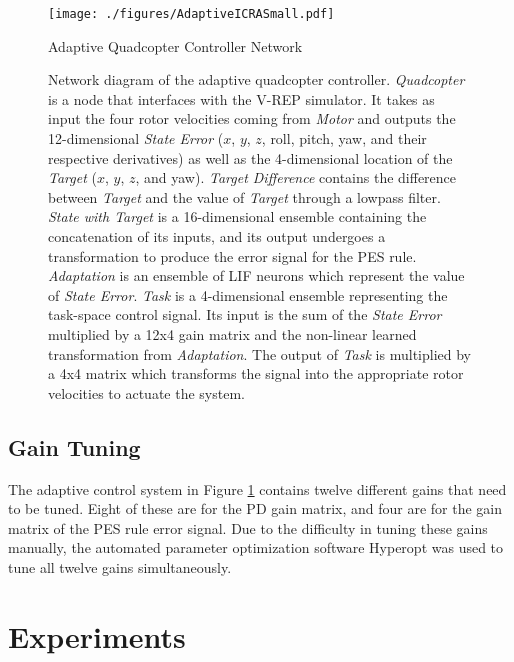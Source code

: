 \documentclass[letterpaper, 10 pt, conference]{ieeeconf}  %
\begin{document}
\begin{figure}
\centering
\texttt{[image: ./figures/AdaptiveICRASmall.pdf]}
\caption{Adaptive Quadcopter Controller Network}
\label{fig:NetFinal}
\captionsetup{singlelinecheck=off,font=footnotesize}
\caption*{Network diagram of the adaptive quadcopter controller. \textit{Quadcopter} is a node that interfaces with the V-REP simulator. It takes as input the four rotor velocities coming from \textit{Motor} and outputs the 12-dimensional \textit{State Error} ($x$, $y$, $z$, roll, pitch, yaw, and their respective derivatives) as well as the 4-dimensional location of the \textit{Target} ($x$, $y$, $z$, and yaw). \textit{Target Difference} contains the difference between \textit{Target} and the value of \textit{Target} through a lowpass filter. \textit{State with Target} is a 16-dimensional ensemble containing the concatenation of its inputs, and its output undergoes a transformation to produce the error signal for the PES rule. \textit{Adaptation} is an ensemble of LIF neurons which represent the value of \textit{State Error}. \textit{Task} is a 4-dimensional ensemble representing the task-space control signal. Its input is the sum of the \textit{State Error} multiplied by a 12x4 gain matrix and the non-linear learned transformation from \textit{Adaptation}. The output of \textit{Task} is multiplied by a 4x4 matrix which transforms the signal into the appropriate rotor velocities to actuate the system.}
\end{figure}

\subsection{Gain Tuning}

The adaptive control system in Figure \ref{fig:NetFinal} contains twelve different gains that need to be tuned.
Eight of these are for the PD gain matrix, and four are for the gain matrix of the PES rule error signal.
Due to the difficulty in tuning these gains manually, the automated parameter optimization software Hyperopt \cite{bergstra2015hyperopt} was used to tune all twelve gains simultaneously.


\section{Experiments}
\end{document}
